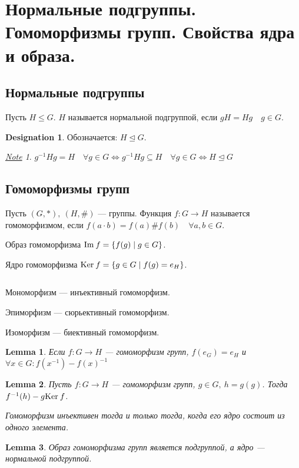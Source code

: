 \documentclass[11pt]{book}
\renewcommand{\le}{\leqslant}
\newcommand{\im}{{\mathop{\text{\rm Im}}}\:}
\renewcommand{\ker}{{\mathop{\text{\rm Ker}}}\:}
\theoremstyle{definition}
\theoremstyle{plain}
\theoremstyle{plain}
\newtheorem{lm}{Lemma}
\theoremstyle{definition}
\newtheorem*{name}{Designation}
\theoremstyle{remark}
\newtheorem*{note}{\underline{Note}}
\begin{document}
\section{Нормальные подгруппы. Гомоморфизмы групп. Свойства ядра и образа.}
\subsection{Нормальные подгруппы}
\begin{defn}
    Пусть $H \le G$.
    $H$ называется {\sf нормальной подгруппой}, если $gH = Hg \quad g \in  G$.
    \begin{name}
	Обозначается: $H \trianglelefteq G$.
    \end{name}
\end{defn}
\begin{note}
    $g^{-1} H g = H \quad \forall g \in  G \Longleftrightarrow  g^{-1} H g \subseteq H \quad \forall g \in  G \Longleftrightarrow H \trianglelefteq G$
\end{note}
\subsection{Гомоморфизмы групп}
\begin{defn}
    Пусть $ (G, *), ~ (H, \#)$ --- группы. Функция $ f: G \to  H$ называется {\sf гомоморфизмом}, если  $ f(a \cdot b) = f(a)\#f(b) \quad \forall a, b \in G$.

    Образ гомоморфизма $ \im f = \{f(g) \mid g \in G\}$.

    Ядро гомоморфизма $ \ker f = \{g \in G\mid f(g)=e_H \}$.
\end{defn}
\begin{defn}
    $ $
    \begin{description}[noitemsep]
	\item {\sf Мономорфизм} --- инъективный гомоморфизм.
	\item {\sf Эпиморфизм} --- сюрьективный гомоморфизм.
	\item {\sf Изоморфизм} --- биективный гомоморфизм.
    \end{description}
\end{defn}
\begin{lm}
    Если $ f: G \to H$ --- гомоморфизм групп, $ f(e_G) = e_H$ и  $ \forall x \in G: f(x^{-1}) - f(x) ^{-1}$
\end{lm}
\begin{lm}
    Пусть $ f: G \to  H$ --- гомоморфизм групп, $ g \in G, ~ h= g(g)$. Тогда $ f^{-1}(h) - g\ker f$.

    Гомоморфизм инъективен тогда и только тогда, когда его ядро состоит из одного элемента.
\end{lm}
\begin{lm}
    Образ гомоморфизма групп является подгруппой, а ядро ---  нормальной подгруппой.
\end{lm}
\end{document}
